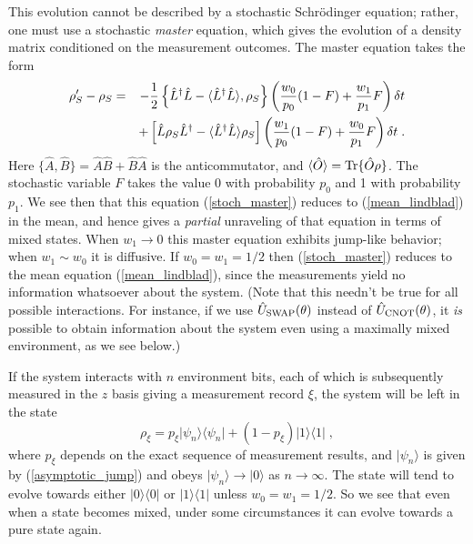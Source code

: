 \documentclass[12pt]{article}
\def\bra#1{{\langle #1 |}}
\def\ket#1{{| #1 \rangle}}
\def\expect#1{{\langle #1 \rangle}}
\def\tr{{\rm Tr}}
\def\U{{\hat U}}
\def\O{{\hat O}}
\def\A{{\hat A}}
\def\B{{\hat B}}
\def\L{{\hat L}}
\def\Ldag{{\hat L^\dagger}}
\begin{document}
This evolution cannot be described by a stochastic Schr\"odinger
equation; rather, one must use a stochastic {\it master} equation,
which gives the evolution of a density matrix conditioned on the
measurement outcomes.  The master equation takes the form
\begin{eqnarray}
\rho'_S - \rho_S &=&
  - {1\over2} \left\{ \Ldag\L - \expect{\Ldag\L},\rho_S \right\}
  \left( { w_0\over p_0 } (1-F)
  + {w_1\over p_1} F \right) \delta t \nonumber\\
&& + \left[ \L \rho_S \Ldag - \expect{\Ldag\L}\rho_S \right]
  \left( { w_1\over p_0 } (1-F) + { w_0\over p_1 } F
  \right) \delta t \;.
\label{stoch_master}
\end{eqnarray}
Here $\{\A,\B\} = \A\B + \B\A$ is the anticommutator, and
$\expect\O = \tr\{\O\rho\}$.
The stochastic variable $F$ takes the value 0 with probability $p_0$
and 1 with probability $p_1$.  We see then that this equation
(\ref{stoch_master}) reduces to (\ref{mean_lindblad}) in the mean,
and hence gives a {\it partial} unraveling of that equation in terms
of mixed states.  When $w_1 \rightarrow 0$ this master equation exhibits
jump-like behavior; when $w_1 \sim w_0$ it is diffusive.
If $w_0 = w_1 = 1/2$ then (\ref{stoch_master}) reduces to the mean
equation (\ref{mean_lindblad}), since the measurements yield no information
whatsoever about the system.  (Note that this needn't be true for all
possible interactions.  For instance, if we use $\U_{\rm SWAP}(\theta)$
instead of $\U_{\rm CNOT}(\theta)$, it {\it is} possible to obtain
information about the system even using a maximally mixed environment,
as we see below.)

If the system interacts with $n$ environment bits, each of which is
subsequently measured in the $z$ basis giving a measurement record $\xi$,
the system will be left in the state
\begin{equation}
\rho_\xi = p_\xi \ket{\psi_n}\bra{\psi_n} + (1-p_\xi)\ket1\bra1 \;,
\label{rho_xi}
\end{equation}
where $p_\xi$ depends on the exact sequence of measurement results, and
$\ket{\psi_n}$ is given by (\ref{asymptotic_jump}) and obeys
$\ket{\psi_n}\rightarrow\ket0$ as $n\rightarrow\infty$.  The state will
tend to evolve towards either $\ket0\bra0$ or $\ket1\bra1$ unless
$w_0=w_1=1/2$.  So we see that even when a state becomes mixed, under some
circumstances it can evolve towards a pure state again.
\end{document}
